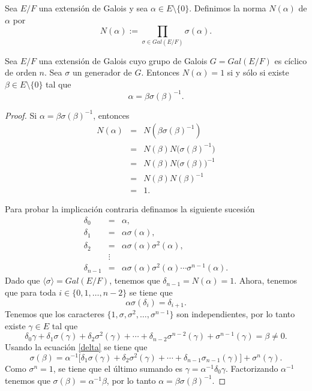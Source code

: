 \begin{definicion}
    Sea $E/F$ una extensi\'on de Galois y sea $\alpha\in E\setminus\{0\}$. 
    Definimos la norma $N(\alpha)$ de $\alpha$ por \[N(\alpha) := \prod_{\sigma \in Gal(E/F)}\sigma(\alpha).\]
\end{definicion}


\begin{teorema}
    Sea $E/F$ una extensi\'on de Galois cuyo grupo de Galois $G = Gal(E/F)$ es c\'iclico 
    de orden $n$. Sea $\sigma$ un generador de $G$. Entonces $N(\alpha) = 1$ si y s\'olo 
    si existe $\beta\in E\setminus \{0\}$ tal que \[\alpha = \beta\sigma (\beta)^{-1}.\]
\end{teorema}

\begin{proof}
    Si $\alpha = \beta\sigma (\beta)^{-1}$, entonces
    \begin{eqnarray*}
	N(\alpha) &	=&	N(\beta\sigma (\beta)^{-1})		\\
		  &	=&	N(\beta)N\big(\sigma(\beta)^{-1}\big)	\\
		  &	=&	N(\beta)N\big(\sigma(\beta)\big)^{-1}	\\
		  &	=&	N(\beta)N(\beta)^{-1}			\\
		  &	=&	1.
    \end{eqnarray*}

    Para probar la implicaci\'on contraria definamos la siguiente sucesi\'on
    \begin{eqnarray*}
	\delta_0 &		=&		\alpha,					\\
	\delta_1 &		=&		\alpha\sigma(\alpha),			\\
	\delta_2 &		=&		\alpha\sigma(\alpha)\sigma^{2}(\alpha),	\\
		 &		\vdots&							\\
	\delta_{n-1} &		=&		\alpha\sigma(\alpha)\sigma^{2}(\alpha)\cdots\sigma^{n-1}(\alpha).
    \end{eqnarray*}
    Dado que $\langle \sigma\rangle = Gal(E/F)$, tenemos que $\delta_{n-1} = N(\alpha) = 1$. Ahora, tenemos que para toda $i \in \{0,1,\ldots, n-2\}$ se tiene que
    \begin{equation}    \label{delta}
	\alpha\sigma(\delta_i) = \delta_{i+1}.
    \end{equation}
    Tenemos que los caracteres $\{1, \sigma, \sigma^2, \ldots, \sigma^{n-1}\}$ son independientes, por lo tanto existe $\gamma\in E$ tal que
    \[\delta_0\gamma + \delta_1\sigma(\gamma) + \delta_2\sigma^2(\gamma) + \cdots + \delta_{n-2}\sigma^{n-2}(\gamma) + \sigma^{n-1}(\gamma) = \beta \neq 0.\]
    Usando la ecuaci\'on \eqref{delta} se tiene que
    \[\sigma(\beta) = \alpha^{-1}\big[\delta_1\sigma(\gamma) + \delta_2\sigma^2(\gamma) + \cdots + \delta_{n-1}\sigma_{n-1}(\gamma)\big] + \sigma^n(\gamma).\]
    Como $\sigma^n = 1$, se tiene que el \'ultimo sumando es $\gamma = \alpha^{-1}\delta_0\gamma$. Factorizando $\alpha^{-1}$ tenemos que $\sigma(\beta) = \alpha^{-1}\beta$, por lo tanto $\alpha = \beta\sigma (\beta)^{-1}$.
\end{proof}

